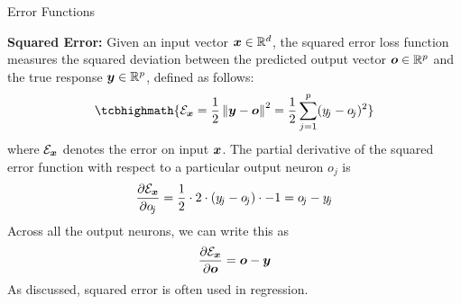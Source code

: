 \begin{frame}{Error Functions}
%

    {\bf Squared Error:} Given an input vector ${\boldsymbol x} \in {\mathord{\mathbb R}}^d$,
        the squared error loss function measures the squared deviation
        between the predicted output vector ${\boldsymbol o} \in {\mathord{\mathbb R}}^p$ and the
        true response ${\boldsymbol y} \in {\mathord{\mathbb R}}^p$, defined as follows: 
    \begin{align*}
        \tcbhighmath{
    \cE_\bx = \frac{1}{2} \norm{\by - \bo}^2 
= \frac{1}{2} \sum_{j=1}^p (y_{\!j} - o_{\!j})^2}
\end{align*}
where ${\mathcal E}_{\boldsymbol x}$ denotes the error on input ${\boldsymbol x}$.
%        
        The partial derivative of the squared error function with
        respect to a particular output neuron $o_{\!j}$ is
        \begin{align*}
            \frac{\partial {\mathcal E}_{\boldsymbol x}}{\partial o_{\!j}} = 
            \frac{1}{2} \cdot 2 \cdot (y_{\!j} - o_{\!j}) \cdot -1 = 
            o_{\!j} -
            y_{\!j}
        \end{align*}
        Across all the output neurons, we can write this as
        \begin{align*}
            \frac{\partial{\mathcal E}_{\boldsymbol x}}{\partial {\boldsymbol o}} = {\boldsymbol o} - {\boldsymbol y}
        \end{align*}
%
As discussed, squared error is often used in regression.
\end{frame}

